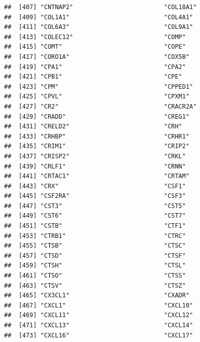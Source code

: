 \documentclass[
]{article}
\begin{document}
\begin{verbatim}
##  [407] "CNTNAP2"                         "COL18A1"                        
##  [409] "COL1A1"                          "COL4A1"                         
##  [411] "COL6A3"                          "COL9A1"                         
##  [413] "COLEC12"                         "COMP"                           
##  [415] "COMT"                            "COPE"                           
##  [417] "CORO1A"                          "COX5B"                          
##  [419] "CPA1"                            "CPA2"                           
##  [421] "CPB1"                            "CPE"                            
##  [423] "CPM"                             "CPPED1"                         
##  [425] "CPVL"                            "CPXM1"                          
##  [427] "CR2"                             "CRACR2A"                        
##  [429] "CRADD"                           "CREG1"                          
##  [431] "CRELD2"                          "CRH"                            
##  [433] "CRHBP"                           "CRHR1"                          
##  [435] "CRIM1"                           "CRIP2"                          
##  [437] "CRISP2"                          "CRKL"                           
##  [439] "CRLF1"                           "CRNN"                           
##  [441] "CRTAC1"                          "CRTAM"                          
##  [443] "CRX"                             "CSF1"                           
##  [445] "CSF2RA"                          "CSF3"                           
##  [447] "CST3"                            "CST5"                           
##  [449] "CST6"                            "CST7"                           
##  [451] "CSTB"                            "CTF1"                           
##  [453] "CTRB1"                           "CTRC"                           
##  [455] "CTSB"                            "CTSC"                           
##  [457] "CTSD"                            "CTSF"                           
##  [459] "CTSH"                            "CTSL"                           
##  [461] "CTSO"                            "CTSS"                           
##  [463] "CTSV"                            "CTSZ"                           
##  [465] "CX3CL1"                          "CXADR"                          
##  [467] "CXCL1"                           "CXCL10"                         
##  [469] "CXCL11"                          "CXCL12"                         
##  [471] "CXCL13"                          "CXCL14"                         
##  [473] "CXCL16"                          "CXCL17"                         

\end{verbatim}
\end{document}
